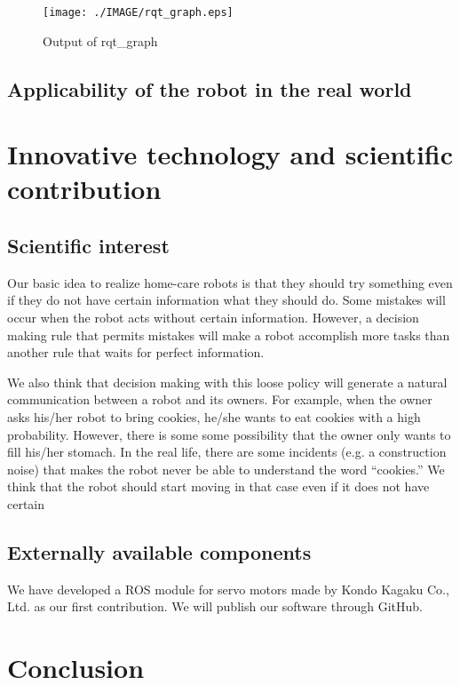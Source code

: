 \documentclass{llncs}
\begin{document}
\begin{figure}[h]
	\begin{center}
		\texttt{[image: ./IMAGE/rqt\_graph.eps]}
		\caption{Output of rqt\_graph}
		\label{fig:rqt_graph}
	\end{center}
\end{figure}

\subsection{Applicability of the robot in the real world}

\section{Innovative technology and scientific contribution}\label{sec:contribution}

\subsection{Scientific interest}

Our basic idea to realize home-care robots is that they
should try something even if they do not have certain information
what they should do. Some mistakes will occur when the robot
acts without certain information.
However, a decision making rule that permits mistakes will make
a robot accomplish more tasks than another rule that waits for
perfect information.

We also think that decision making with this loose policy
will generate a natural communication between a robot and its owners.
For example, when the owner asks his/her robot to bring cookies,
he/she wants to eat cookies with a high probability.
However, there is some some possibility that the owner
only wants to fill his/her stomach.
In the real life, there are some incidents
(e.g. a construction noise) that
makes the robot never be able to understand the word ``cookies.''
We think that the robot should start moving in that case
even if it does not have certain

\subsection{Externally available components}

We have developed a ROS module for servo motors made
by Kondo Kagaku Co., Ltd.
as our first contribution\cite{hayashibara_kondo}.
We will publish our software through GitHub.

\section{Conclusion}\label{sec:conclusion}



\end{document}
